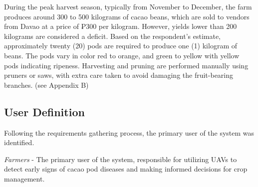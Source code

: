 During the peak harvest season, typically from November to December, the farm produces around 300 to 500 kilograms of cacao beans, which are sold to vendors from Davao at a price of ₱300 per kilogram. However, yields lower than 200 kilograms are considered a deficit. Based on the respondent’s estimate, approximately twenty (20) pods are required to produce one (1) kilogram of beans. The pods vary in color red to orange, and green to yellow with yellow pods indicating ripeness. Harvesting and pruning are performed manually using pruners or saws, with extra care taken to avoid damaging the fruit-bearing branches. (see Appendix B)

\subsection*{User Definition}

Following the requirements gathering process, the primary user of the system was identified.

\textit{Farmers} - The primary user of the system, responsible for utilizing UAVs to detect early signs of cacao pod diseases and making informed decisions for crop management.


